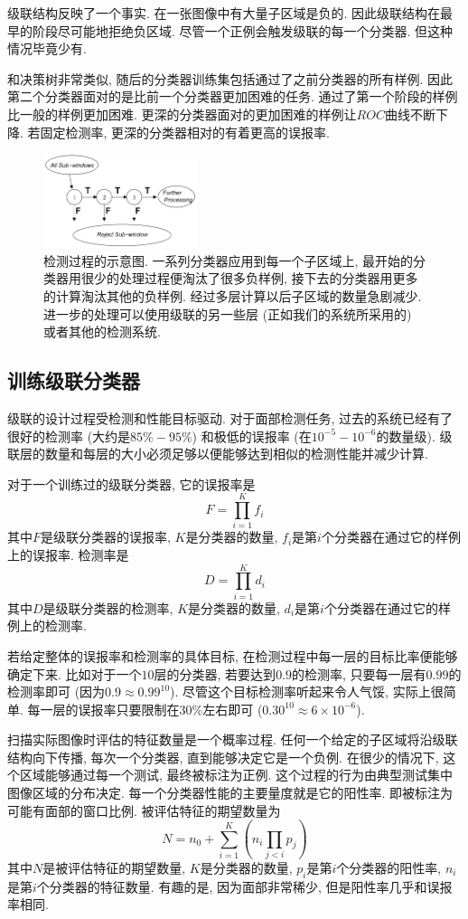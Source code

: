 \documentclass[a4paper,utf8,11pt]{ctexart}
\begin{document}
级联结构反映了一个事实. 在一张图像中有大量子区域是负的. 因此级联结构在最早的阶段尽可能地拒绝负区域. 尽管一个正例会触发级联的每一个分类器. 但这种情况毕竟少有.

和决策树非常类似, 随后的分类器训练集包括通过了之前分类器的所有样例. 因此第二个分类器面对的是比前一个分类器更加困难的任务. 通过了第一个阶段的样例比一般的样例更加困难. 更深的分类器面对的更加困难的样例让$ROC$曲线不断下降. 若固定检测率, 更深的分类器相对的有着更高的误报率.
\begin{figure}
\centering
\includegraphics[width=0.4\textwidth]{process.png}
\caption{检测过程的示意图. 一系列分类器应用到每一个子区域上, 最开始的分类器用很少的处理过程便淘汰了很多负样例, 接下去的分类器用更多的计算淘汰其他的负样例. 经过多层计算以后子区域的数量急剧减少. 进一步的处理可以使用级联的另一些层 (正如我们的系统所采用的) 或者其他的检测系统.}
\label{fig:process}
\end{figure}

\subsection{训练级联分类器}\label{sec:train_cascade}
级联的设计过程受检测和性能目标驱动. 对于面部检测任务, 过去的系统已经有了很好的检测率 (大约是$85\%-95\%$) 和极低的误报率 (在$10^{-5}-10^{-6}$的数量级). 级联层的数量和每层的大小必须足够以便能够达到相似的检测性能并减少计算.

对于一个训练过的级联分类器, 它的误报率是
\[
F=\prod_{i=1}^{K}f_i
\]
其中$F$是级联分类器的误报率, $K$是分类器的数量, $f_i$是第$i$个分类器在通过它的样例上的误报率. 检测率是
\[
    D=\prod_{i=1}^{K}d_i
\]
其中$D$是级联分类器的检测率, $K$是分类器的数量, $d_i$是第$i$个分类器在通过它的样例上的检测率.

若给定整体的误报率和检测率的具体目标, 在检测过程中每一层的目标比率便能够确定下来. 比如对于一个$10$层的分类器, 若要达到$0.9$的检测率, 只要每一层有$0.99$的检测率即可 (因为$0.9\approx0.99^{10}$). 尽管这个目标检测率听起来令人气馁, 实际上很简单. 每一层的误报率只要限制在$30\%$左右即可 ($0.30^{10}\approx6\times10^{-6}$).

扫描实际图像时评估的特征数量是一个概率过程. 任何一个给定的子区域将沿级联结构向下传播, 每次一个分类器, 直到能够决定它是一个负例. 在很少的情况下, 这个区域能够通过每一个测试, 最终被标注为正例. 这个过程的行为由典型测试集中图像区域的分布决定. 每一个分类器性能的主要量度就是它的阳性率. 即被标注为可能有面部的窗口比例. 被评估特征的期望数量为
\[
N=n_0+\sum_{i=1}^{K}\left(n_i\prod_{j<i}p_j\right)
\]
其中$N$是被评估特征的期望数量, $K$是分类器的数量, $p_i$是第$i$个分类器的阳性率, $n_i$是第$i$个分类器的特征数量. 有趣的是, 因为面部非常稀少, 但是阳性率几乎和误报率相同.
\end{document}
